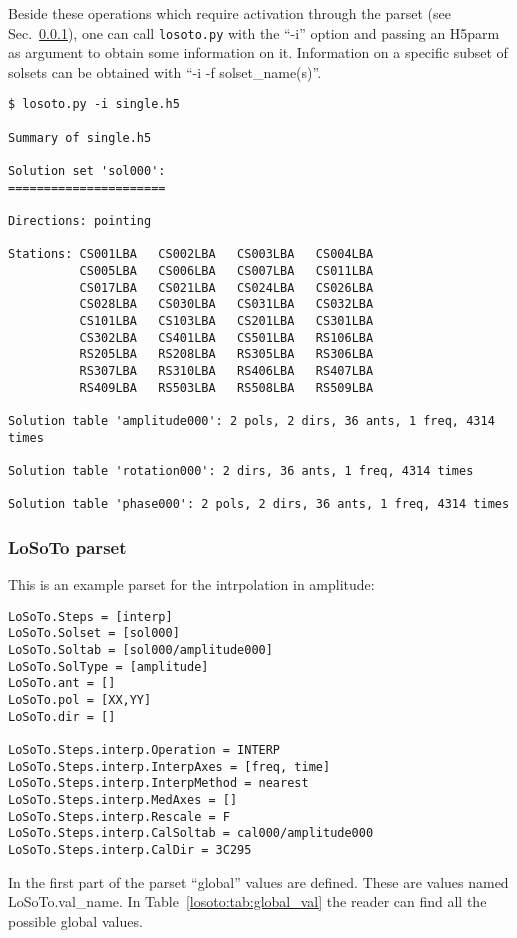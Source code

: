 \documentclass[structabstract]{article}
\begin{document}
Beside these operations which require activation through the \losoto{} parset (see Sec.~\ref{losoto:parset}), one can call \texttt{losoto.py} with the ``-i'' option and passing an H5parm as argument to obtain some information on it. Information on a specific subset of solsets can be obtained with ``-i -f solset\_name(s)''.

\begin{verbatim}
$ losoto.py -i single.h5

Summary of single.h5

Solution set 'sol000':
======================

Directions: pointing

Stations: CS001LBA   CS002LBA   CS003LBA   CS004LBA
          CS005LBA   CS006LBA   CS007LBA   CS011LBA
          CS017LBA   CS021LBA   CS024LBA   CS026LBA
          CS028LBA   CS030LBA   CS031LBA   CS032LBA
          CS101LBA   CS103LBA   CS201LBA   CS301LBA
          CS302LBA   CS401LBA   CS501LBA   RS106LBA
          RS205LBA   RS208LBA   RS305LBA   RS306LBA
          RS307LBA   RS310LBA   RS406LBA   RS407LBA
          RS409LBA   RS503LBA   RS508LBA   RS509LBA

Solution table 'amplitude000': 2 pols, 2 dirs, 36 ants, 1 freq, 4314 times

Solution table 'rotation000': 2 dirs, 36 ants, 1 freq, 4314 times

Solution table 'phase000': 2 pols, 2 dirs, 36 ants, 1 freq, 4314 times
\end{verbatim}

\subsubsection{LoSoTo parset}
\label{losoto:parset}

This is an example parset for the intrpolation in amplitude:
\begin{verbatim}
LoSoTo.Steps = [interp]
LoSoTo.Solset = [sol000]
LoSoTo.Soltab = [sol000/amplitude000]
LoSoTo.SolType = [amplitude]
LoSoTo.ant = []
LoSoTo.pol = [XX,YY]
LoSoTo.dir = []

LoSoTo.Steps.interp.Operation = INTERP
LoSoTo.Steps.interp.InterpAxes = [freq, time]
LoSoTo.Steps.interp.InterpMethod = nearest
LoSoTo.Steps.interp.MedAxes = []
LoSoTo.Steps.interp.Rescale = F
LoSoTo.Steps.interp.CalSoltab = cal000/amplitude000
LoSoTo.Steps.interp.CalDir = 3C295
\end{verbatim}

In the first part of the parset ``global'' values are defined. These are values named LoSoTo.val\_name. In Table~\ref{losoto:tab:global_val} the reader can find all the possible global values.
\end{document}

